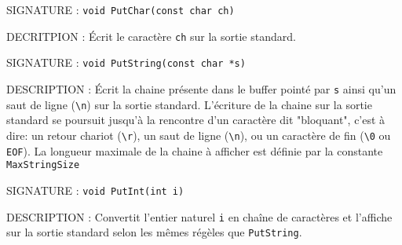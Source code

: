 \documentclass{article}
\begin{document}
		\vspace{2.5mm}
		\begin{description}
			\item{SIGNATURE : } \texttt{void PutChar(const char ch)}
			\item{DECRITPION : } Écrit le caractère \texttt{ch} sur la sortie standard. 
		\end{description}
		\vspace{3mm}
		\begin{description}
			\item{SIGNATURE : } \texttt{void PutString(const char *s)}
			\item{DESCRIPTION : } Écrit la chaine présente dans le buffer pointé par \texttt{s} ainsi qu'un saut de ligne (\texttt{\textbackslash{}n}) sur la sortie standard. L'écriture de la chaine sur la sortie standard se poursuit jusqu'à la rencontre d'un caractère dit "bloquant", c'est à dire: un retour chariot (\texttt{\textbackslash{}r}), un saut de ligne (\texttt{\textbackslash{}n}), ou un caractère de fin (\texttt{\textbackslash{}0} ou \texttt{EOF}). La longueur maximale de la chaine à afficher est définie par la constante \texttt{MaxStringSize}
		\end{description}
		\vspace{2.5mm}
		\begin{description}
			\item{SIGNATURE : } \texttt{void PutInt(int i)}
			\item{DESCRIPTION : } Convertit l'entier naturel \texttt{i} en chaîne de caractères et l'affiche sur la sortie standard selon les mêmes régèles que \texttt{PutString}.
		\end{description}
\end{document}
